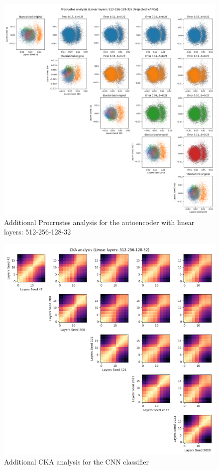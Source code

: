 \documentclass[../main.tex]{subfiles}
\begin{document}
\begin{figure}[ht!]
    \centering
    \includegraphics[width=\textwidth]{figures/rs/sim_ae/procrustes_512-256-128-32__42_200_121_2013_2023.png} 
    \caption{Additional Procrustes analysis for the autoencoder with linear layers: 512-256-128-32}
    \label{fig:extra_proc_ae_512_256_128_32}
\end{figure}
%
\begin{figure}[ht!]
     \centering
    \includegraphics[width=\textwidth]{figures/rs/sim_cls/cka_512-256-128-32__42_200_121_2013_2023.png} 
    \caption{Additional CKA analysis for the CNN classifier}
    \label{fig:extra_cka_cls}
\end{figure}
\end{document}
